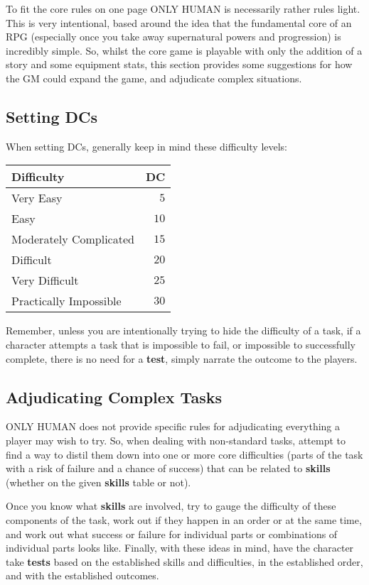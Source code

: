 \documentclass[11pt]{article}
\begin{document}
\begin{multicols}{3}
  To fit the core rules on one page ONLY HUMAN is necessarily rather rules light. This is very intentional, based around the idea that the fundamental core of an RPG (especially once you take away supernatural powers and progression) is incredibly simple. So, whilst the core game is playable with only the addition of a story and some equipment stats, this section provides some suggestions for how the GM could expand the game, and adjudicate complex situations.

  \subsection*{Setting DCs}

  When setting DCs, generally keep in mind these difficulty levels:

  \begin{center}
    \begin{tabular}{ lr }
      Difficulty & DC \\
      \hline
      Very Easy & $5$ \\
      Easy & $10$ \\
      Moderately Complicated & $15$ \\
      Difficult & $20$ \\
      Very Difficult & $25$ \\
      Practically Impossible & $30$
    \end{tabular}
  \end{center}

  Remember, unless you are intentionally trying to hide the difficulty of a task, if a character attempts a task that is impossible to fail, or impossible to successfully complete, there is no need for a \textbf{test}, simply narrate the outcome to the players.

  \subsection*{Adjudicating Complex Tasks}

  ONLY HUMAN does not provide specific rules for adjudicating everything a player may wish to try. So, when dealing with non-standard tasks, attempt to find a way to distil them down into one or more core difficulties (parts of the task with a risk of failure and a chance of success) that can be related to \textbf{skills} (whether on the given \textbf{skills} table or not).

  Once you know what \textbf{skills} are involved, try to gauge the difficulty of these components of the task, work out if they happen in an order or at the same time, and work out what success or failure for individual parts or combinations of individual parts looks like. Finally, with these ideas in mind, have the character take \textbf{tests} based on the established skills and difficulties, in the established order, and with the established outcomes.


\end{multicols}
\end{document}
